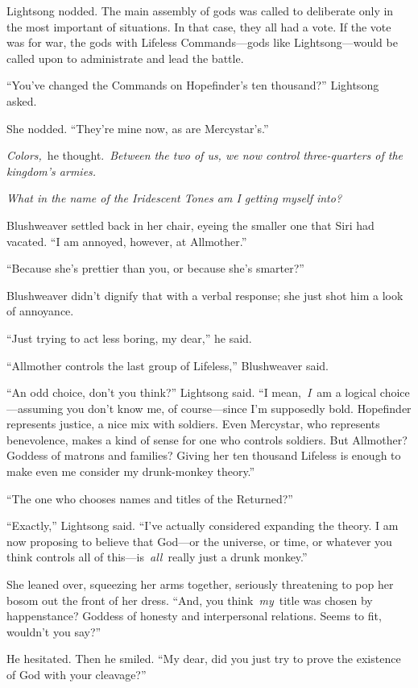 Lightsong nodded. The main assembly of gods was called to deliberate only in the most important of situations. In that case, they all had a vote. If the vote was for war, the gods with Lifeless Commands—gods like Lightsong—would be called upon to administrate and lead the battle.

“You’ve changed the Commands on Hopefinder’s ten thousand?” Lightsong asked.

She nodded. “They’re mine now, as are Mercystar’s.”

\textit{Colors,}~he thought.~\textit{Between the two of us, we now control three-quarters of the kingdom’s armies.}

\textit{What in the name of the Iridescent Tones am I getting myself into?}

Blushweaver settled back in her chair, eyeing the smaller one that Siri had vacated. “I am annoyed, however, at Allmother.”

“Because she’s prettier than you, or because she’s smarter?”

Blushweaver didn’t dignify that with a verbal response; she just shot him a look of annoyance.

“Just trying to act less boring, my dear,” he said.

“Allmother controls the last group of Lifeless,” Blushweaver said.

“An odd choice, don’t you think?” Lightsong said. “I mean,~\textit{I}~am a logical choice—assuming you don’t know me, of course—since I’m supposedly bold. Hopefinder represents justice, a nice mix with soldiers. Even Mercystar, who represents benevolence, makes a kind of sense for one who controls soldiers. But Allmother? Goddess of matrons and families? Giving her ten thousand Lifeless is enough to make even me consider my drunk-monkey theory.”

“The one who chooses names and titles of the Returned?”

“Exactly,” Lightsong said. “I’ve actually considered expanding the theory. I am now proposing to believe that God—or the universe, or time, or whatever you think controls all of this—is~\textit{all}~really just a drunk monkey.”

She leaned over, squeezing her arms together, seriously threatening to pop her bosom out the front of her dress. “And, you think~\textit{my}~title was chosen by happenstance? Goddess of honesty and interpersonal relations. Seems to fit, wouldn’t you say?”

He hesitated. Then he smiled. “My dear, did you just try to prove the existence of God with your cleavage?”

